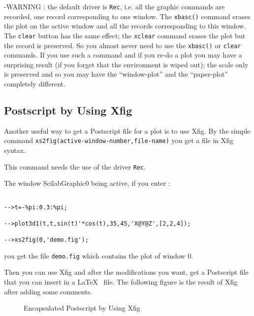 -WARNING : the default driver is {\tt Rec}, i.e. all the graphic commands are
recorded, one record corresponding to one window. The {\tt xbasc()} command
erases the plot on the active window and all the records corresponding to
this window. The {\tt  clear} button has the same effect; the {\tt xclear}
command erases the plot but the record is preserved. So you almost never need
to use the {\tt xbasc()} or {\tt  clear} commands. If you use such a command 
and if you re-do a plot you may have a surprising result (if you forget
that the environment is wiped out); the scale only is preserved and so you 
may have the ``window-plot'' and the ``paper-plot'' completely different.


\subsection{Postscript by Using Xfig}

Another useful way to get a Postscript file for a plot is to use Xfig.
By the simple command {\tt xs2fig(active-window-number,file-name)} you get
a file in Xfig syntax. 

This command needs the use of the driver {\tt Rec}.

The window ScilabGraphic0 being  active, if you enter :

\begin{verbatim}

-->t=-%pi:0.3:%pi;
 
-->plot3d1(t,t,sin(t)'*cos(t),35,45,'X@Y@Z',[2,2,4]);
 
-->xs2fig(0,'demo.fig');   

\end{verbatim}

you get the file {\tt demo.fig} which contains the plot 
of window 0. 

Then you can use Xfig and after the modifications you want, get a Postscript 
file that you can insert in a \LaTeX~ file. The following figure is the result
of Xfig after adding some comments.

\begin{figure}
\caption{Encapsulated Postscript by Using Xfig}
\label{xfig2ps}
\end{figure}



